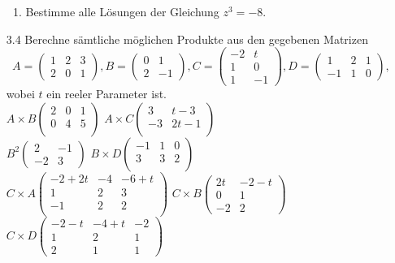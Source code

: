 \documentclass{HM}
\begin{document}
\begin{enumerate}
\begin{enumerate}
\item Bestimme alle Lösungen der Gleichung $z^3 = -8$.
\end{enumerate}
\item [3.4] Berechne sämtliche möglichen Produkte aus den gegebenen Matrizen
$$
A=\begin{pmatrix}
1 & 2 & 3\\
2 & 0 & 1
\end{pmatrix},
B=\begin{pmatrix}
0 & 1\\
2 & -1
\end{pmatrix},
C=\begin{pmatrix}
-2 & t\\
1 & 0\\
1 & -1
\end{pmatrix},
D=\begin{pmatrix}
1 & 2 & 1\\
-1 & 1 & 0
\end{pmatrix},
$$
wobei $t$ ein reeler Parameter ist.\\

$A\times B\begin{pmatrix}
	2 & 0 & 1 \\
	0 & 4 & 5 \\
\end{pmatrix}$
$A\times C\begin{pmatrix}
	3 & t-3\\
	-3 & 2t-1\\
\end{pmatrix}$\\

$B^2\begin{pmatrix}
	2 & -1 \\
	-2 & 3
\end{pmatrix}$
$B\times D\begin{pmatrix}
	-1 & 1 & 0\\
	3 & 3 & 2\\
\end{pmatrix}$\\

$C\times A\begin{pmatrix}
	-2+2t & -4 & -6+t\\
	1 & 2 & 3\\
	-1 & 2 & 2\\
\end{pmatrix}$
$C\times B\begin{pmatrix}
	2t & -2-t\\
	0 & 1\\
	-2 & 2
\end{pmatrix}$
$C\times D\begin{pmatrix}
	-2-t & -4+t &-2\\
	1 & 2 & 1\\
	2 & 1 & 1
\end{pmatrix}$\\


\end{enumerate}
\end{document}
